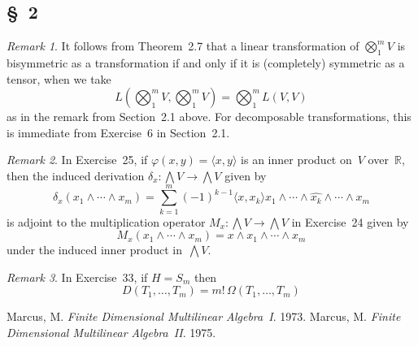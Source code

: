 \documentclass[letterpaper,12pt]{article}
\newcommand{\R}{\mathbb{R}}
\newcommand{\bigtprod}{\bigotimes}
\newcommand{\medtprod}{{\textstyle\bigtprod}}
\newcommand{\eprod}{\wedge}
\newcommand{\bigeprod}{\bigwedge}
\newcommand{\medeprod}{{\textstyle\bigeprod}}
\newcommand{\delete}{\widehat}
\newcommand{\sprod}[2]{\langle#1,#2\rangle}
\newcommand{\multi}[4]{#2_{#3}#1\cdots#1#2_{#4}}
\newcommand{\eprods}[3]{\multi{\eprod}{#1}{#2}{#3}}
\theoremstyle{definition}
\theoremstyle{remark}
\newtheorem*{rmk}{Remark}
\begin{document}
\subsection*{\S~2}
\begin{rmk}
It follows from Theorem~2.7 that a linear transformation of \(\medtprod_1^m V\) is bisymmetric as a transformation if and only if it is (completely) symmetric as a tensor, when we take
\[L(\medtprod_1^m V,\medtprod_1^m V)=\medtprod_1^m L(V,V)\]
as in the remark from Section~2.1 above. For decomposable transformations, this is immediate from Exercise~6 in Section~2.1.
\end{rmk}

\begin{rmk}
In Exercise~25, if \(\varphi(x,y)=\sprod{x}{y}\) is an inner product on~\(V\) over~\(\R\), then the induced derivation \(\delta_x:\medeprod V\to\medeprod V\) given by
\[\delta_x(\eprods{x}{1}{m})=\sum_{k=1}^m(-1)^{k-1}\sprod{x}{x_k}x_1\eprod\cdots\eprod\delete{x_k}\eprod\cdots\eprod x_m\]
is adjoint to the multiplication operator \(M_x:\medeprod V\to\medeprod V\) in Exercise~24 given by
\[M_x(\eprods{x}{1}{m})=x\eprod\eprods{x}{1}{m}\]
under the induced inner product in~\(\medeprod V\).
\end{rmk}

\begin{rmk}
In Exercise~33, if \(H=S_m\) then
\[D(T_1,\ldots,T_m)=m!\,\Omega(T_1,\ldots,T_m)\]
\end{rmk}

\newpage
\begin{thebibliography}{0}
 Marcus, M. \textit{Finite Dimensional Multilinear Algebra~I}. 1973.
 Marcus, M. \textit{Finite Dimensional Multilinear Algebra~II}. 1975.
\end{thebibliography}
\end{document}
